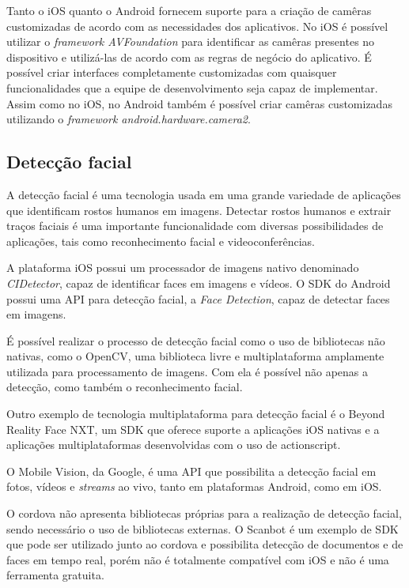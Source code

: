 Tanto o iOS quanto o Android fornecem suporte para a criação de camêras customizadas de acordo com as necessidades dos aplicativos. No iOS é possível utilizar o \textit{framework AVFoundation} para identificar as camêras 
presentes no dispositivo e utilizá-las de acordo com as regras de negócio do aplicativo. É possível criar interfaces completamente customizadas com quaisquer funcionalidades que a equipe de desenvolvimento seja capaz de 
implementar. Assim como no iOS, no Android também é possível criar camêras customizadas utilizando o \textit{framework android.hardware.camera2}.

\subsection{Detecção facial} \label{subsec:facial}
A detecção facial é uma tecnologia usada em uma grande variedade de aplicações que identificam
rostos humanos em imagens. Detectar rostos humanos e extrair traços faciais é uma importante funcionalidade
com diversas possibilidades de aplicações, tais como reconhecimento facial e videoconferências. %

A plataforma iOS possui um processador de imagens nativo denominado \textit{CIDetector}, capaz de identificar faces em imagens e vídeos.
O SDK do Android possui uma API para detecção facial, a \textit{Face Detection}, capaz de detectar faces em imagens.

É possível realizar o processo de detecção facial como o uso de bibliotecas não nativas, como o OpenCV, uma biblioteca livre 
e multiplataforma amplamente utilizada para processamento de imagens. Com ela é possível não apenas a detecção, como também
o reconhecimento facial.

Outro exemplo de tecnologia multiplataforma para detecção facial é o Beyond Reality Face NXT, um SDK que oferece suporte 
a aplicações iOS nativas e a aplicações multiplataformas desenvolvidas com o uso de actionscript.%

O Mobile Vision, da Google, é uma API que possibilita a detecção facial em fotos, vídeos e \textit{streams} ao vivo, 
tanto em plataformas Android, como em iOS.

O cordova não apresenta bibliotecas próprias para a realização de detecção facial, sendo necessário o uso de bibliotecas externas.
O Scanbot é um exemplo de SDK que pode ser utilizado junto ao cordova e possibilita detecção de documentos e de faces em tempo real,
 porém não é totalmente compatível com iOS e não é uma ferramenta gratuita. %

